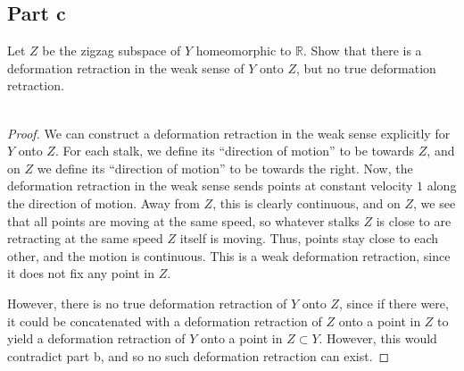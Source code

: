 \documentclass[fontsize=11pt]{scrartcl} %
\numberwithin{equation}{section} %
\numberwithin{figure}{section} %
\numberwithin{table}{section} %
\newcommand{\R}{\mathbb{R}}
\begin{document}
\subsection*{Part c}
Let $Z$ be the zigzag subspace of $Y$ homeomorphic to $\R$. Show that there is a
deformation retraction in the weak sense of $Y$ onto $Z$, but no true
deformation retraction. 
\\
\\
\begin{proof}
     We can construct a deformation retraction in the weak sense explicitly for
     $Y$ onto $Z$. For each stalk, we define its ``direction of motion'' to be
     towards $Z$, and on $Z$ we define its ``direction of motion'' to be towards
     the right. Now, the deformation retraction in the weak sense sends points
     at constant velocity $1$ along the direction of motion. Away from $Z$, this
     is clearly continuous, and on $Z$, we see that all points are moving at the
     same speed, so whatever stalks $Z$ is close to are retracting at the same
     speed $Z$ itself is moving. Thus, points stay close to each other, and the
     motion is continuous. This is a weak deformation retraction, since it does
     not fix any point in $Z$.

     However, there is no true deformation retraction of $Y$ onto $Z$, since if
     there were, it could be concatenated with a deformation retraction of $Z$
     onto a point in $Z$ to yield a deformation retraction of $Y$ onto a point
     in $Z\subset Y$. However, this would contradict part b, and so no such
     deformation retraction can exist.
\end{proof}
\end{document}
